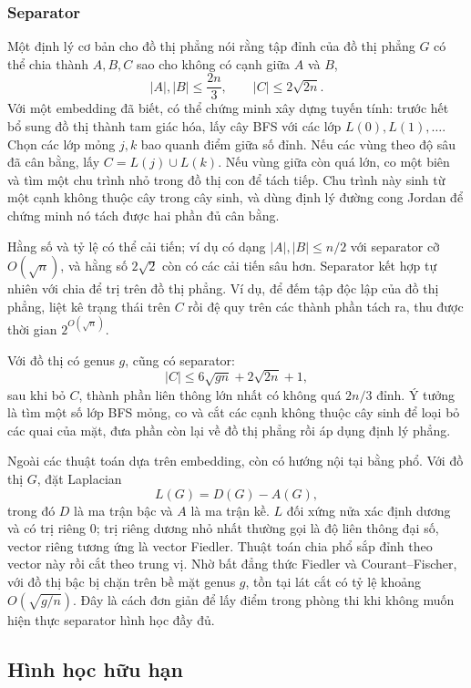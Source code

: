 \documentclass[11pt]{article}
\begin{document}
\subsubsection{Separator}

Một định lý cơ bản cho đồ thị phẳng nói rằng tập đỉnh của đồ thị phẳng $G$ có
thể chia thành $A,B,C$ sao cho không có cạnh giữa $A$ và $B$,
\[
  |A|,|B|\le \frac{2n}{3},\qquad |C|\le 2\sqrt{2n}.
\]
Với một embedding đã biết, có thể chứng minh xây dựng tuyến tính: trước hết bổ
sung đồ thị thành tam giác hóa, lấy cây BFS với các lớp $L(0),L(1),\ldots$.
Chọn các lớp mỏng $j,k$ bao quanh điểm giữa số đỉnh. Nếu các vùng theo độ sâu
đã cân bằng, lấy $C=L(j)\cup L(k)$. Nếu vùng giữa còn quá lớn, co một biên và
tìm một chu trình nhỏ trong đồ thị con để tách tiếp. Chu trình này sinh từ một
cạnh không thuộc cây trong cây sinh, và dùng định lý đường cong Jordan để chứng
minh nó tách được hai phần đủ cân bằng.

Hằng số và tỷ lệ có thể cải tiến; ví dụ có dạng $|A|,|B|\le n/2$ với separator
cỡ $O(\sqrt n)$, và hằng số $2\sqrt2$ còn có các cải tiến sâu hơn. Separator kết
hợp tự nhiên với chia để trị trên đồ thị phẳng. Ví dụ, để đếm tập độc lập của
đồ thị phẳng, liệt kê trạng thái trên $C$ rồi đệ quy trên các thành phần tách
ra, thu được thời gian $2^{O(\sqrt n)}$.

Với đồ thị có genus $g$, cũng có separator:
\[
  |C|\le 6\sqrt{gn}+2\sqrt{2n}+1,
\]
sau khi bỏ $C$, thành phần liên thông lớn nhất có không quá $2n/3$ đỉnh. Ý
tưởng là tìm một số lớp BFS mỏng, co và cắt các cạnh không thuộc cây sinh để
loại bỏ các quai của mặt, đưa phần còn lại về đồ thị phẳng rồi áp dụng định lý
phẳng.

Ngoài các thuật toán dựa trên embedding, còn có hướng nội tại bằng phổ. Với đồ
thị $G$, đặt Laplacian
\[
  L(G)=D(G)-A(G),
\]
trong đó $D$ là ma trận bậc và $A$ là ma trận kề. $L$ đối xứng nửa xác định
dương và có trị riêng $0$; trị riêng dương nhỏ nhất thường gọi là độ liên thông
đại số, vector riêng tương ứng là vector Fiedler. Thuật toán chia phổ sắp đỉnh
theo vector này rồi cắt theo trung vị. Nhờ bất đẳng thức Fiedler và
Courant--Fischer, với đồ thị bậc bị chặn trên bề mặt genus $g$, tồn tại lát cắt
có tỷ lệ khoảng $O(\sqrt{g/n})$. Đây là cách đơn giản để lấy điểm trong phòng
thi khi không muốn hiện thực separator hình học đầy đủ.

\subsection{Hình học hữu hạn}
\end{document}
